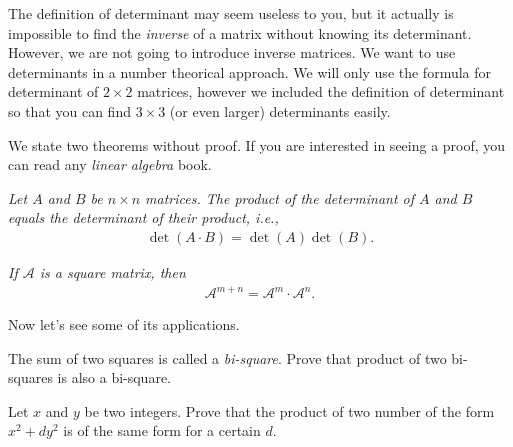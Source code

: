 \documentclass{subfile}
\begin{document}
The definition of determinant may seem useless to you, but it actually is impossible to find the \textit{inverse} of a matrix without knowing its determinant. However, we are not going to introduce inverse matrices. We want to use determinants in a number theorical approach. We will only use the formula for determinant of $2 \times 2$ matrices, however we included the definition of determinant so that you can find $3 \times 3$ (or even larger) determinants easily.

We state two theorems without proof. If you are interested in seeing a proof, you can read any \textit{linear algebra} book.

	\begin{theorem}\slshape
	Let $A$ and $B$ be $n\times n$ matrices. The product of the determinant of $A$ and $B$ equals the determinant of their product, i.e.,
	\begin{align*}
	\det(A \cdot B)=\det(A)\det(B).
	\end{align*}
	\end{theorem}
	

\begin{theorem}\slshape
If $\mathcal A$ is a square matrix, then 
\begin{align*}
\mathcal A^{m+n}=\mathcal A^m \cdot \mathcal{A}^n.
\end{align*}
\end{theorem}

Now let's see some of its applications.

\begin{problem}
The sum of two squares is called a \textit{bi-square}. Prove that product of two bi-squares is also a bi-square.
\end{problem}

\begin{problem}
Let $x$ and $y$ be two integers. Prove that the product of two number of the form $x^2+dy^2$ is of the same form for a  certain $d$. 
\end{problem}
\end{document}
